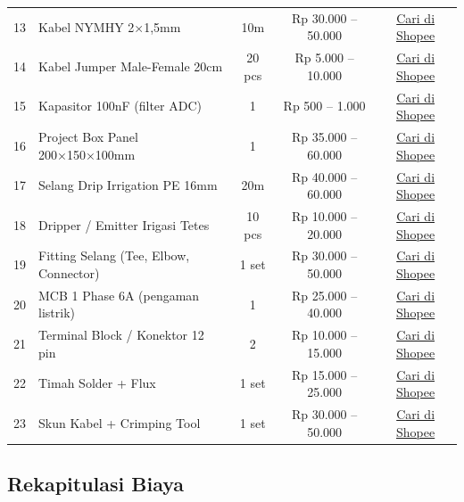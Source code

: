 \documentclass[12pt,a4paper,oneside]{report}
\begin{document}
\begin{table}[H]
\begin{tabularx}{\textwidth}{c X c c c}
13 & Kabel NYMHY 2×1,5mm & 10m & Rp 30.000 -- 50.000 & \href{https://shopee.co.id/search?keyword=NYMHY+2x1.5+listrik}{Cari di Shopee} \\
14 & Kabel Jumper Male-Female 20cm & 20 pcs & Rp 5.000 -- 10.000 & \href{https://shopee.co.id/search?keyword=kabel+jumper+male+female+arduino}{Cari di Shopee} \\
15 & Kapasitor 100nF (filter ADC) & 1 & Rp 500 -- 1.000 & \href{https://shopee.co.id/search?keyword=kondensator+100nF+ceramic}{Cari di Shopee} \\
16 & Project Box Panel 200×150×100mm & 1 & Rp 35.000 -- 60.000 & \href{https://shopee.co.id/search?keyword=project+box+panel+listrik+200x150}{Cari di Shopee} \\
17 & Selang Drip Irrigation PE 16mm & 20m & Rp 40.000 -- 60.000 & \href{https://shopee.co.id/search?keyword=selang+PE+drip+irrigation+16mm}{Cari di Shopee} \\
18 & Dripper / Emitter Irigasi Tetes & 10 pcs & Rp 10.000 -- 20.000 & \href{https://shopee.co.id/search?keyword=dripper+irigasi+tetes+tanaman}{Cari di Shopee} \\
19 & Fitting Selang (Tee, Elbow, Connector) & 1 set & Rp 30.000 -- 50.000 & \href{https://shopee.co.id/search?keyword=fitting+selang+irigasi+tetes+16mm}{Cari di Shopee} \\
20 & MCB 1 Phase 6A (pengaman listrik) & 1 & Rp 25.000 -- 40.000 & \href{https://shopee.co.id/search?keyword=MCB+1+phase+6A+ampere}{Cari di Shopee} \\
21 & Terminal Block / Konektor 12 pin & 2 & Rp 10.000 -- 15.000 & \href{https://shopee.co.id/search?keyword=terminal+block+12+pin+kabel}{Cari di Shopee} \\
22 & Timah Solder + Flux & 1 set & Rp 15.000 -- 25.000 & \href{https://shopee.co.id/search?keyword=timah+solder+flux+rosin}{Cari di Shopee} \\
23 & Skun Kabel + Crimping Tool & 1 set & Rp 30.000 -- 50.000 & \href{https://shopee.co.id/search?keyword=crimping+tool+skun+kabel}{Cari di Shopee} \\
\bottomrule
\end{tabularx}
\end{table}


\subsection{Rekapitulasi Biaya}
\end{document}
